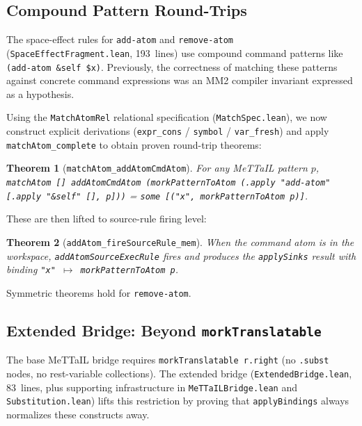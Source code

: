 \documentclass[11pt]{article}
\newtheorem{theorem}{Theorem}[section]
\theoremstyle{definition}
\theoremstyle{remark}
\newcommand{\MeTTaIL}{\textup{MeTTaIL}}
\begin{document}
\subsection{Compound Pattern Round-Trips}
\label{sec:matchatom-roundtrip}

The space-effect rules for \texttt{add-atom} and \texttt{remove-atom}
(\texttt{SpaceEffectFragment.lean}, 193~lines) use compound command
patterns like \texttt{(add-atom \&self \$x)}.  Previously, the
correctness of matching these patterns against concrete command
expressions was an MM2 compiler invariant expressed as a hypothesis.

Using the \texttt{MatchAtomRel} relational specification
(\texttt{MatchSpec.lean}), we now construct explicit derivations
(\texttt{expr\_cons} / \texttt{symbol} / \texttt{var\_fresh}) and
apply \texttt{matchAtom\_complete} to obtain proven round-trip
theorems:

\begin{theorem}[\texttt{matchAtom\_addAtomCmdAtom}]
For any \MeTTaIL{} pattern $p$,
\texttt{matchAtom [] addAtomCmdAtom (morkPatternToAtom (.apply "add-atom"
[.apply "\&self" [], p]))} = \texttt{some [("x", morkPatternToAtom p)]}.
\end{theorem}

\noindent
These are then lifted to source-rule firing level:

\begin{theorem}[\texttt{addAtom\_fireSourceRule\_mem}]
When the command atom is in the workspace, \texttt{addAtomSourceExecRule}
fires and produces the \texttt{applySinks} result with binding
\texttt{"x"~$\mapsto$~morkPatternToAtom~p}.
\end{theorem}

\noindent
Symmetric theorems hold for \texttt{remove-atom}.

\subsection{Extended Bridge: Beyond \texttt{morkTranslatable}}
\label{sec:extendedbridge}

The base \MeTTaIL{} bridge requires \texttt{morkTranslatable r.right}
(no \texttt{.subst} nodes, no rest-variable collections).  The extended
bridge (\texttt{ExtendedBridge.lean}, 83~lines, plus supporting
infrastructure in \texttt{MeTTaILBridge.lean} and
\texttt{Substitution.lean}) lifts this restriction by proving that
\texttt{applyBindings} always normalizes these constructs away.
\end{document}
